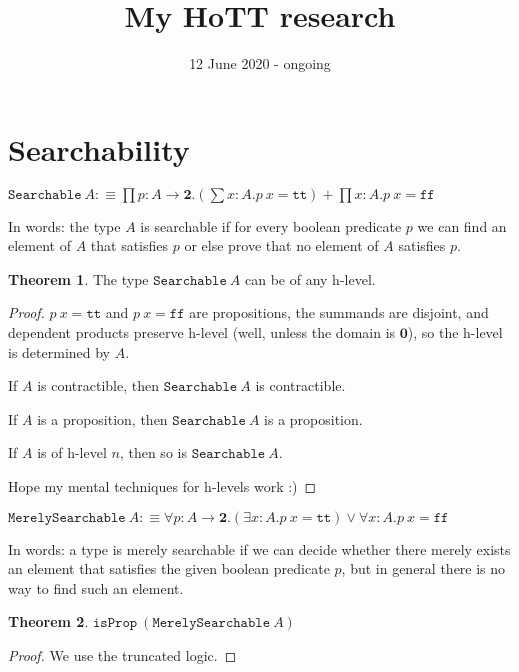 \documentclass[11pt]{article}
\title{My HoTT research}
\date{12 June 2020 - ongoing}
\theoremstyle{definition}
\newtheorem{theorem}{Theorem}[section]
\newcommand{\txt}[1]{\texttt{#1}}
\newcommand{\text}[1]{\texttt{#1}}
\renewcommand{\(}{\left(}
\renewcommand{\)}{\right)}
\newcommand{\defn}{:\equiv}
\newcommand{\isProp}{\text{isProp}}
\newcommand{\apl}[2]{#1\ #2}
\newcommand{\Empty}{\mathbf{0}}
\newcommand{\Bool}{\mathbf{2}}
\newcommand{\true}{\txt{tt}}
\newcommand{\false}{\txt{ff}}
\newcommand{\dprod}[2]{\prod #1.#2}
\newcommand{\dsum}[2]{\sum #1.#2}
\newcommand{\all}[2]{\forall #1.#2}
\newcommand{\ex}[2]{\exists #1.#2}
\begin{document}
\maketitle

\section{Searchability}

\newcommand{\Searchable}{\txt{Searchable}}

\begin{center}
$\displaystyle \apl{\Searchable}{A} \defn \dprod{p : A \to \Bool}{\(\dsum{x : A}{\apl{p}{x} = \true}\) + \dprod{x : A}{\apl{p}{x} = \false}}$
\end{center}

In words: the type $A$ is searchable if for every boolean predicate $p$ we can find an element of $A$ that satisfies $p$ or else prove that no element of $A$ satisfies $p$.

\begin{theorem}
The type $\apl{\Searchable}{A}$ can be of any h-level.
\end{theorem}
\begin{proof}
$\apl{p}{x} = \true$ and $\apl{p}{x} = \false$ are propositions, the summands are disjoint, and dependent products preserve h-level (well, unless the domain is $\Empty$), so the h-level is determined by $A$.

If $A$ is contractible, then $\apl{\Searchable}{A}$ is contractible.

If $A$ is a proposition, then $\apl{\Searchable}{A}$ is a proposition.

If $A$ is of h-level $n$, then so is $\apl{\Searchable}{A}$.

Hope my mental techniques for h-levels work :)

\end{proof}

\newcommand{\MerelySearchable}{\txt{MerelySearchable}}
\begin{center}
$\displaystyle \apl{\MerelySearchable}{A} \defn \all{p : A \to \Bool}{\(\ex{x : A}{\apl{p}{x} = \true}\) \lor \all{x : A}{\apl{p}{x} = \false}}$
\end{center}

In words: a type is merely searchable if we can decide whether there merely exists an element that satisfies the given boolean predicate $p$, but in general there is no way to find such an element.

\begin{theorem}
$\apl{\isProp}{(\apl{\MerelySearchable}{A})}$
\end{theorem}
\begin{proof}
We use the truncated logic.
\end{proof}
\end{document}
